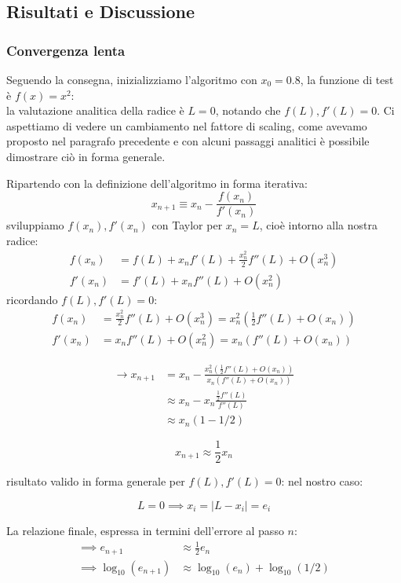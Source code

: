 \subsection{Risultati e Discussione}
\subsubsection{Convergenza lenta}
Seguendo la consegna, inizializziamo l'algoritmo con $x_0=0.8$, la funzione di test è $f(x)=x^2$:\\
la valutazione analitica della radice è $L=0$, notando che $f(L), f'(L)=0$. Ci aspettiamo di vedere un cambiamento nel fattore di scaling, come avevamo proposto nel paragrafo precedente e con alcuni passaggi analitici è possibile dimostrare ciò in forma generale.

\medskip
\noindent
Ripartendo con la definizione dell'algoritmo in forma iterativa:
\[
    x_{n+1} \equiv x_n - \frac{f(x_n)}{f'(x_n)}
\]
sviluppiamo $f(x_n), f'(x_n)$ con Taylor per $x_n = L$, cioè intorno alla nostra radice:
\begin{align*}
    f(x_n) &= f(L) + x_n f'(L) + \frac{x_n^2}{2}f''(L) + O(x_n^3)\\
    f'(x_n) &= f'(L) + x_n f''(L) + O(x_n^2)
\end{align*}
ricordando $f(L), f'(L)=0$:
\begin{align*}
    f(x_n) &= \frac{x_n^2}{2}f''(L) + O(x_n^3) = x_n^2 (\frac{1}{2} f''(L) + O(x_n))\\
    f'(x_n) &=x_n f''(L) + O(x_n^2) = x_n (f''(L) + O(x_n))
\end{align*}

\begin{align*}
\xrightarrow{}  x_{n+1} &=  x_n - \frac{x_n^2 (\frac{1}{2}f''(L) + O(x_n))}{x_n (f''(L) + O(x_n))} \\
&\approx  x_n - x_n \frac{\frac{1}{2}f''(L)}{f''(L)} \\
&\approx  x_n (1 - 1/2) 
\end{align*}

\[
x_{n+1} \approx\frac{1}{2} x_n
\]

risultato valido in forma generale per $f(L), f'(L)=0$: nel nostro caso:

\[
L=0 \implies x_i = |L-x_i| = e_i 
\]

La relazione finale, espressa in termini dell'errore al passo $n$:
\begin{align*}
\implies e_{n+1} &\approx\frac{1}{2} e_n \\
\implies \log_{10}(e_{n+1}) &\approx \log_{10}(e_n) + \log_{10}(1/2)  \\
\end{align*}

